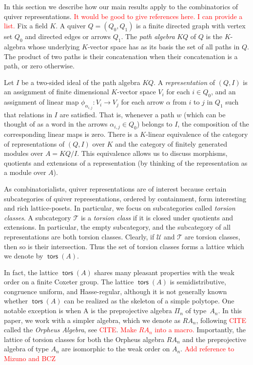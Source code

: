 \documentclass{amsart}
\theoremstyle{definition}
\DeclareMathOperator{\tors}{\mathsf{tors}}
\begin{document}
In this section we describe how our main results apply to the combinatorics of quiver representations.
\textcolor{red}{It would be good to give references here. I can provide a list. }
Fix a field $K$.
A quiver $Q=(Q_0,Q_1)$ is a finite directed graph with vertex set $Q_0$ and directed edges or arrows $Q_1$.
The \emph{path algebra} $KQ$ of $Q$ is the $K$-algebra whose underlying $K$-vector space has as its basis the set of all paths in $Q$.
The product of two paths is their concatenation when their concatenation is a path, or zero otherwise.

Let $I$ be a two-sided ideal of the path algebra $KQ$. 
A \emph{representation} of $(Q,I)$ is an assignment of finite dimensional $K$-vector space $V_i$ for each $i\in Q_0$, and
an assignment of linear map $\phi_{\alpha_{i,j}}: V_i\to V_j$ for each arrow $\alpha$ from $i$ to $j$ in $Q_1$ such that relations in $I$ are satisfied.
That is, whenever a path $w$ (which can be thought of as a word in the arrows $\alpha_{i,j}\in Q_0$) belongs to $I$, the composition of the corresponding linear maps is zero.
There is a $K$-linear equivalence of 
the category of representations of $(Q,I)$ over $K$ and the category of finitely generated modules over $A=KQ/I$.
This equivalence allows us to discuss morphisms, quotients and extensions of a representation (by thinking of the representation as a module over $A$).

As combinatorialists, quiver representations are of interest because certain subcategories of quiver representations, ordered by containment, form interesting and rich lattice-posets.
In particular, we focus on subcategories called \emph{torsion classes}.
A subcategory $\mathcal{T}$ is a \emph{torsion class} if it is closed under quotients and extensions. In particular, the empty subcategory, and the subcategory of all representations are both torsion classes.
Clearly, if $\mathcal{U}$ and $\mathcal{T}$ are torsion classes, then so is their intersection.
Thus the set of torsion classes forms a lattice which we denote by $\tors(A)$.

In fact, the lattice $\tors(A)$ shares many pleasant properties with the weak order on a finite Coxeter group.
The lattice $\tors(A)$ is semidistributive, congruence uniform, and Hasse-regular, although it is not generally known whether $\tors(A)$ can be realized as the skeleton of a simple polytope.
One notable exception is when A is the preprojective algebra $\Pi_n$ of type~$A_n$.
In this paper, we work with a simpler algebra, which we denote as $RA_n$, following \textcolor{red}{CITE} called the \emph{Orpheus Algebra}, see \textcolor{red}{CITE}.
\textcolor{red}{Make $RA_n$ into a macro.}
Importantly, the lattice of torsion classes for both the Orpheus algebra $RA_n$ and the preprojective algebra of type $A_n$ are isomorphic to the weak order on $A_n$.
\textcolor{red}{Add reference to Mizuno and BCZ}
\end{document}
